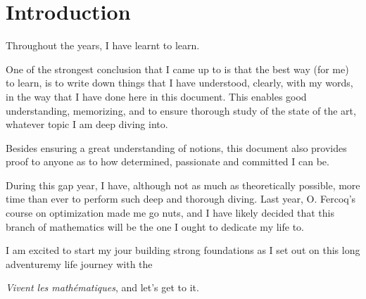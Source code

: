 \chapter*{Introduction}
\pagestyle{fancy}

Throughout the years, I have learnt to learn. 

One of the strongest conclusion that I came up to is that the best way (for me) to learn, is to write down things that I have understood, clearly, with my words, in the way that I have done here in this document. This enables good understanding, memorizing, and to ensure thorough study of the state of the art, whatever topic I am deep diving into.

Besides ensuring a great understanding of notions, this document also provides proof to anyone as to how determined, passionate and committed I can be.

During this gap year, I have, although not as much as theoretically possible, more time than ever to perform such deep and thorough diving. Last year, O. Fercoq's course on optimization made me go nuts, and I have likely decided that this branch of mathematics will be the one I ought to dedicate my life to.

I am excited to start my jour building strong foundations as I set out on this long adventuremy life journey with the 

\textit{Vivent les mathématiques}, and let's get to it.

